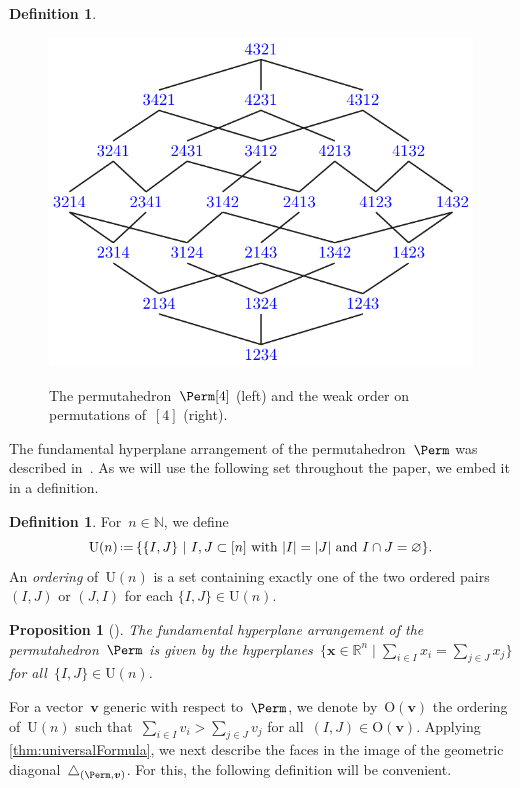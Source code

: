 \documentclass{amsart}
\newcommand{\darkblue}{\color{darkblue}} %
\newtheorem{proposition}[theorem]{Proposition}
\theoremstyle{definition}
\newtheorem{definition}[theorem]{Definition}
\newcommand{\R}{\mathbb{R}} %
\newcommand{\N}{\mathbb{N}} %
\renewcommand{\b}[1]{{\boldsymbol{#1}}} %
\newcommand{\Un}{\mathrm{U}} %
\newcommand{\Or}{\mathrm{O}} %
\newcommand{\bigset}[2]{\big\{ #1 \;\big|\; #2 \big\}} %
\newcommand{\eqdef}{\mbox{\,\raisebox{0.2ex}{\scriptsize\ensuremath{\mathrm:}}\ensuremath{=}\,}} %
\newcommand{\defn}[1]{\textsl{\darkblue #1}} %
\renewcommand{\b}[1]{\boldsymbol{#1}} %
\begin{document}
\begin{definition}
\begin{figure}
{		\includegraphics[scale=.7]{weakOrder}
	}
	\caption{The permutahedron~$\Perm[4]$ (left) and the weak order on permutations of~$[4]$ (right).}
	\label{fig:permutahedron}
\end{figure}
\end{definition}

The fundamental hyperplane arrangement of the permutahedron~$\Perm$ was described in~\cite[Sect.~3.1]{LaplanteAnfossi}.
As we will use the following set throughout the paper, we embed it in a definition.

\begin{definition}
\label{def:Un}
For~$n \in \N$, we define
\[
\Un(n) \eqdef \{ \{I,J\} \ | \ I,J \subset [n] \text{ with } |I|=|J| \text{ and } I \cap J = \varnothing\}.
\]
An \defn{ordering} of~$\Un(n)$ is a set containing exactly one of the two ordered pairs $(I,J)$ or $(J,I)$ for each $\{I,J\} \in \Un(n)$.
\end{definition}

\begin{proposition}[{\cite[Sect.~3.1]{LaplanteAnfossi}}]
The fundamental hyperplane arrangement of the permutahedron~$\Perm$ is given by the hyperplanes~$\bigset{\b{x} \in \R^n}{\sum\limits_{i \in I} x_i = \sum\limits_{j \in J} x_j}$ for all~$\{I,J\} \in \Un(n)$.
\end{proposition}

For a vector~$\b{v}$ generic with respect to~$\Perm$, we denote by~$\Or(\b{v})$ the ordering of~$\Un(n)$ such that~$\sum_{i \in I} v_i > \sum_{j \in J} v_j$ for all~$(I,J) \in \Or(\b{v})$.
Applying \cref{thm:universalFormula}, we next describe the faces in the image of the geometric diagonal~$\triangle_{(\Perm, \b{v})}$.
For this, the following definition will be convenient.
\end{document}
